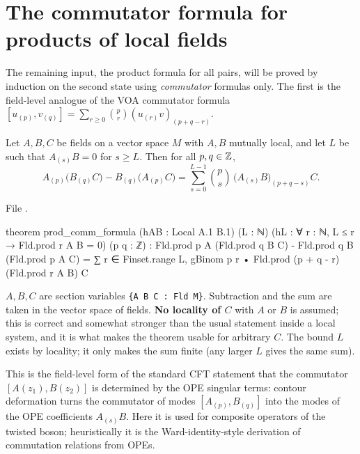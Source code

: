 \section{The commutator formula for products of local fields}\label{ch07:sec:comm}

The remaining input, the product formula for all pairs, will be proved by induction on the
second state using \emph{commutator} formulas only. The first is the field-level analogue of the
VOA commutator formula $[u_{(p)},v_{(q)}] = \sum_{r\ge0}\binom pr(u_{(r)}v)_{(p+q-r)}$.

\begin{theorem}\label{ch07:thm:comm}
Let $A,B,C$ be fields on a vector space $M$ with $A,B$ mutually local, and let $L$ be such that
$A_{(s)}B=0$ for $s\ge L$. Then for all $p,q\in{\mathbb{Z}}$,
\begin{equation*}
  A_{(p)}\bigl(B_{(q)}C\bigr) - B_{(q)}\bigl(A_{(p)}C\bigr) = \sum_{s=0}^{L-1}\binom ps\,
  \bigl(A_{(s)}B\bigr)_{(p+q-s)}C .
\end{equation*}
\end{theorem}

\noindent File .
\begin{leancode}
theorem prod_comm_formula (hAB : Local A.1 B.1) (L : ℕ)
    (hL : ∀ r : ℕ, L ≤ r → Fld.prod r A B = 0) (p q : ℤ) :
    Fld.prod p A (Fld.prod q B C) - Fld.prod q B (Fld.prod p A C)
      = ∑ r ∈ Finset.range L, gBinom p r • Fld.prod (p + q - r) (Fld.prod r A B) C
\end{leancode}

\begin{dictionary}
$A,B,C$ are section variables \verb|{A B C : Fld M}|. Subtraction and the sum are taken in the
vector space of fields. \textbf{No locality of $C$} with $A$ or $B$ is assumed; this is
correct and somewhat stronger than the usual statement inside a local system, and it is what
makes the theorem usable for arbitrary $C$. The bound $L$ exists by locality; it only makes the
sum finite (any larger $L$ gives the same sum).
\end{dictionary}

\begin{physics}
This is the field-level form of the standard CFT statement that the commutator $[A(z_1),B(z_2)]$ is determined by the OPE singular terms: contour deformation turns the commutator of modes $[A_{(p)},B_{(q)}]$ into the modes of the OPE coefficients $A_{(s)}B$. Here it is used for composite operators of the twisted boson; heuristically it is the Ward-identity-style derivation of commutation relations from OPEs.
\end{physics}

